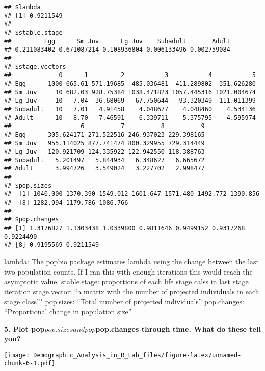\documentclass[]{article}
\newenvironment{Shaded}{\begin{snugshade}}{\end{snugshade}}
\newcommand{\KeywordTok}[1]{\textcolor[rgb]{0.13,0.29,0.53}{\textbf{#1}}}
\newcommand{\OperatorTok}[1]{\textcolor[rgb]{0.81,0.36,0.00}{\textbf{#1}}}
\newcommand{\NormalTok}[1]{#1}
\begin{document}
\begin{verbatim}
## $lambda
## [1] 0.9211549
## 
## $stable.stage
##         Egg      Sm Juv      Lg Juv    Subadult       Adult 
## 0.211083402 0.671087214 0.108936804 0.006133496 0.002759084 
## 
## $stage.vectors
##             0      1         2           3           4           5
## Egg      1000 665.61 571.19685  485.036481  411.289802  351.626280
## Sm Juv     10 682.03 928.75384 1038.471823 1057.445316 1021.004674
## Lg Juv     10   7.04  36.68069   67.750644   93.320349  111.011399
## Subadult   10   7.01   4.91458    4.048677    4.048460    4.534136
## Adult      10   8.70   7.46591    6.339711    5.375795    4.595974
##                   6          7          8          9
## Egg      305.624171 271.522516 246.937023 229.398165
## Sm Juv   955.114025 877.741474 800.329955 729.314449
## Lg Juv   120.921709 124.335922 122.942550 118.388763
## Subadult   5.201497   5.844934   6.348627   6.665672
## Adult      3.994726   3.549024   3.227702   2.998477
## 
## $pop.sizes
##  [1] 1040.000 1370.390 1549.012 1601.647 1571.480 1492.772 1390.856
##  [8] 1282.994 1179.786 1086.766
## 
## $pop.changes
## [1] 1.3176827 1.1303438 1.0339800 0.9811646 0.9499152 0.9317268 0.9224490
## [8] 0.9195569 0.9211549
\end{verbatim}

lambda: The popbio package estimates lambda using the change between the
last two population counts. If I ran this with enough iterations this
would reach the asymptotic value. stable.stage: proportions of each life
stage calss in last stage iteration stage.vector: ``a matrix with the
number of projected individuals in each stage class''" pop.sizes:
``Total number of projected individuals'' pop.changes: ``Proportional
change in population size''

\textbf{5. Plot pop\(pop.sizes and pop\)pop.changes through time. What
do these tell you?}

\begin{Shaded}
\end{Shaded}

\texttt{[image: Demographic\_Analysis\_in\_R\_Lab\_files/figure-latex/unnamed-chunk-6-1.pdf]}

\begin{Shaded}
\end{Shaded}
\end{document}
